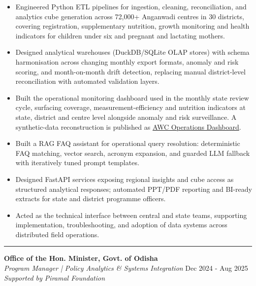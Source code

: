 \documentclass[a4paper,10pt]{article}
\begin{document}
\begin{itemize}
\item Engineered Python ETL pipelines for ingestion, cleaning, reconciliation, and analytics cube generation across 72,000+ Anganwadi centres in 30 districts, covering registration, supplementary nutrition, growth monitoring and health indicators for children under six and pregnant and lactating mothers.
\item Designed analytical warehouses (DuckDB/SQLite OLAP stores) with schema harmonisation across changing monthly export formats, anomaly and risk scoring, and month-on-month drift detection, replacing manual district-level reconciliation with automated validation layers.
\item Built the operational monitoring dashboard used in the monthly state review cycle, surfacing coverage, measurement-efficiency and nutrition indicators at state, district and centre level alongside anomaly and risk surveillance. A synthetic-data reconstruction is published as \href{%%TRACKER_REPO_AWC%%}{AWC Operations Dashboard}.
\item Built a RAG FAQ assistant for operational query resolution: deterministic FAQ matching, vector search, acronym expansion, and guarded LLM fallback with iteratively tuned prompt templates.
\item Designed FastAPI services exposing regional insights and cube access as structured analytical responses; automated PPT/PDF reporting and BI-ready extracts for state and district programme officers.
\item Acted as the technical interface between central and state teams, supporting implementation, troubleshooting, and adoption of data systems across distributed field operations.
\end{itemize}

\vspace{1pt}

\noindent\rule{\textwidth}{0.15pt}
{\large\textbf{Office of the Hon. Minister, Govt. of Odisha}} \\
\textit{Program Manager | Policy Analytics \& Systems Integration} \hfill {\datefont\small Dec 2024 - Aug 2025} \\
{\small \textit{Supported by Piramal Foundation}}
\end{document}
